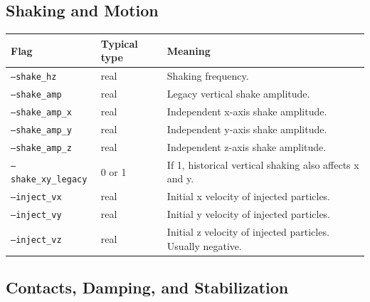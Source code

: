 \documentclass[11pt]{article}
\begin{document}
\subsection{Shaking and Motion}

\begin{longtable}{p{}p{}p{}}
\toprule
\textbf{Flag} & \textbf{Typical type} & \textbf{Meaning} \\
\midrule
\endhead
\texttt{--shake\_hz} & real & Shaking frequency. \\
\texttt{--shake\_amp} & real & Legacy vertical shake amplitude. \\
\texttt{--shake\_amp\_x} & real & Independent x-axis shake amplitude. \\
\texttt{--shake\_amp\_y} & real & Independent y-axis shake amplitude. \\
\texttt{--shake\_amp\_z} & real & Independent z-axis shake amplitude. \\
\texttt{--shake\_xy\_legacy} & 0 or 1 & If 1, historical vertical shaking also affects x and y. \\
\texttt{--inject\_vx} & real & Initial x velocity of injected particles. \\
\texttt{--inject\_vy} & real & Initial y velocity of injected particles. \\
\texttt{--inject\_vz} & real & Initial z velocity of injected particles. Usually negative. \\
\bottomrule
\end{longtable}

\subsection{Contacts, Damping, and Stabilization}
\end{document}
